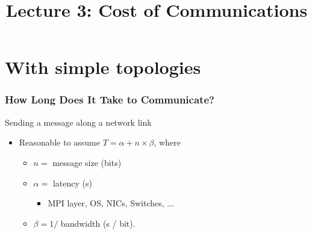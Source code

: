 \documentclass[xcolor={rgb,x11names,svgnames},rgb,x11names,svgnames]{beamer}
\title{Lecture 3: Cost of Communications}
\begin{document}
\begin{frame}[label=title]
  \titlepage
\end{frame}


\section{With simple topologies}

\begin{frame}
  \frametitle{How Long Does It Take to Communicate?}
  
  
  \begin{block}{Sending a message along a network link}
    \begin{itemize}
    \item Reasonable to assume \alert{$T = \alpha + n \times \beta$}, where
      \begin{itemize}
      \item $n =$ message size (bits)
      \item $\alpha =$ \alert{latency} (s)
        \begin{itemize}
        \item MPI layer, OS, NICs, Switches, ...
        \end{itemize}
      \item $\beta = 1 / $ \alert{bandwidth} (s / bit).
      \end{itemize}


\end{itemize}
\end{block}
\end{frame}
\end{document}
